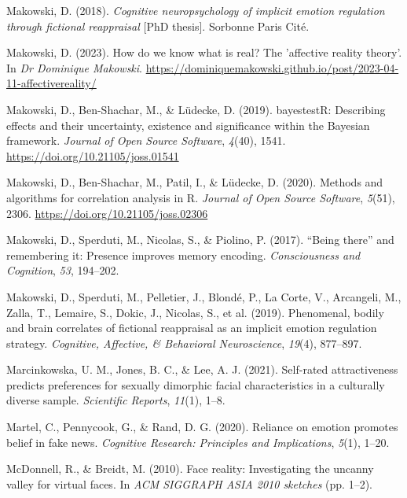 \documentclass[
  man,
  floatsintext,
  longtable,
  nolmodern,
  notxfonts,
  notimes,
  colorlinks=true,linkcolor=blue,citecolor=blue,urlcolor=blue]{apa7}
\newlength{\cslhangindent}
\newenvironment{CSLReferences}[2] %
 {\begin{list}{}{%
  \setlength{\itemindent}{0pt}
  \setlength{\leftmargin}{0pt}
  \setlength{\parsep}{0pt}
  \ifodd #1
   \setlength{\leftmargin}{\cslhangindent}
   \setlength{\itemindent}{-1\cslhangindent}
  \fi
  \setlength{\itemsep}{#2\baselineskip}}}
 {\end{list}}
\begin{document}
\begin{CSLReferences}{1}{0}
Makowski, D. (2018). \emph{Cognitive neuropsychology of implicit emotion
regulation through fictional reappraisal} {[}PhD thesis{]}. Sorbonne
Paris Cit{é}.

Makowski, D. (2023). How do we know what is real? The 'affective reality
theory'. In \emph{Dr Dominique Makowski}.
\url{https://dominiquemakowski.github.io/post/2023-04-11-affectivereality/}

Makowski, D., Ben-Shachar, M., \& Lüdecke, D. (2019). {bayestestR}:
Describing effects and their uncertainty, existence and significance
within the {Bayesian} framework. \emph{Journal of Open Source Software},
\emph{4}(40), 1541. \url{https://doi.org/10.21105/joss.01541}

Makowski, D., Ben-Shachar, M., Patil, I., \& Lüdecke, D. (2020). Methods
and algorithms for correlation analysis in {R}. \emph{Journal of Open
Source Software}, \emph{5}(51), 2306.
\url{https://doi.org/10.21105/joss.02306}

Makowski, D., Sperduti, M., Nicolas, S., \& Piolino, P. (2017). {``Being
there''} and remembering it: Presence improves memory encoding.
\emph{Consciousness and Cognition}, \emph{53}, 194--202.

Makowski, D., Sperduti, M., Pelletier, J., Blondé, P., La Corte, V.,
Arcangeli, M., Zalla, T., Lemaire, S., Dokic, J., Nicolas, S., et al.
(2019). Phenomenal, bodily and brain correlates of fictional reappraisal
as an implicit emotion regulation strategy. \emph{Cognitive, Affective,
\& Behavioral Neuroscience}, \emph{19}(4), 877--897.

Marcinkowska, U. M., Jones, B. C., \& Lee, A. J. (2021). Self-rated
attractiveness predicts preferences for sexually dimorphic facial
characteristics in a culturally diverse sample. \emph{Scientific
Reports}, \emph{11}(1), 1--8.

Martel, C., Pennycook, G., \& Rand, D. G. (2020). Reliance on emotion
promotes belief in fake news. \emph{Cognitive Research: Principles and
Implications}, \emph{5}(1), 1--20.

McDonnell, R., \& Breidt, M. (2010). Face reality: Investigating the
uncanny valley for virtual faces. In \emph{ACM SIGGRAPH ASIA 2010
sketches} (pp. 1--2).


\end{CSLReferences}
\end{document}
